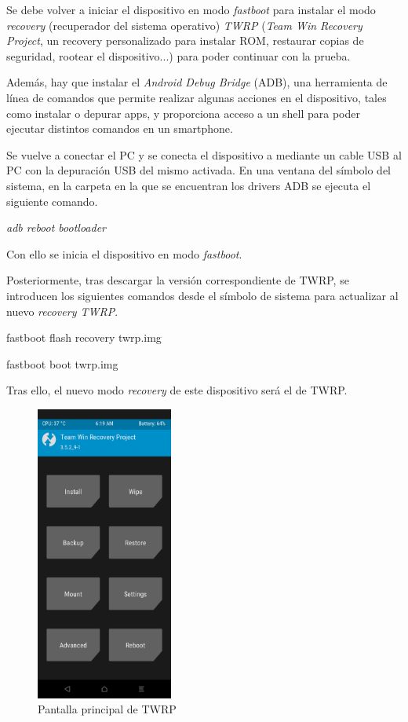 \documentclass[12pt,a4paper,onecolumn,oneside]{report}
\begin{document}
Se debe volver a iniciar el dispositivo en modo \textit{fastboot} para instalar el modo \textit{recovery} (recuperador del sistema operativo) \textit{TWRP} (\textit{Team Win Recovery Project}, un recovery personalizado para instalar ROM, restaurar copias de seguridad, rootear el dispositivo...) para poder continuar con la prueba.

Además, hay que instalar el \textit{Android Debug Bridge} (ADB), una herramienta de línea de comandos que permite realizar algunas acciones en el dispositivo, tales como instalar o depurar apps, y proporciona acceso a un shell para poder ejecutar distintos comandos en un smartphone.

Se vuelve a conectar el PC y se conecta el dispositivo a mediante un cable USB al PC con la depuración USB del mismo activada. En una ventana del símbolo del sistema, en la carpeta en la que se encuentran los drivers ADB se ejecuta el siguiente comando.

\textit{adb reboot bootloader}

Con ello se inicia el dispositivo en modo \textit{fastboot}.

Posteriormente, tras descargar la versión correspondiente de TWRP, se introducen los siguientes comandos desde el símbolo de sistema para actualizar al nuevo \textit{recovery TWRP}.

fastboot flash recovery twrp.img

fastboot boot twrp.img

Tras ello, el nuevo modo \textit{recovery} de este dispositivo será el de TWRP.

\begin{figure}[h] 
\centering
  \includegraphics[width=0.4\textwidth]{figuras/root51.png}
  \caption[Pantalla principal de TWRP]{Pantalla principal de TWRP\\
  }
  \label{fig:root51}
\end{figure}
\end{document}
